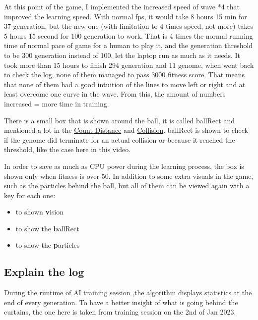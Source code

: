 At this point of the game, I implemented the increased speed of wave *4 that improved the learning speed. With normal fps, it would take 8 hours 15 min for 37 generation, but the new one (with limitation to 4 times speed, not more) takes 5 hours 15 second for 100 generation to work. That is 4 times the normal running time of normal pace of game for a human to play it, and the generation threshold to be 300 generation instead of 100, let the laptop run as much as it needs. It took more than 15 hours to finish 294 generation and 11 genome, when went back to check the log, none of them managed to pass 3000 fitness score. That means that none of them had a good intuition of the lines to move left or right and at least overcome one curve in the wave. From this, the amount of numbers increased = more time in training.

There is a small box that is shown around the ball, it is called ballRect and mentioned a lot in the \hyperref[sec:count-distance]{Count Distance} and \hyperref[sec:collision]{Collision}. ballRect is shown to check if the genome did terminate for an actual collision or because it reached the threshold, like the case here in this video.

In order to save as much as CPU power during the learning process, the box is shown only when fitness is over 50. In addition to some extra visuals in the game, such as the particles behind the ball, but all of them can be viewed again with a key for each one:
\begin{itemize}
\item {} to shown \textbf{v}ision
\item {} to show the \textbf{b}allRect
\item {} to show the \textbf{p}articles
\end{itemize}

\subsection{Explain the log}\label{sec:explain-the-log]}

During the runtime of AI training session ,the algorithm displays statistics at the end of every generation. To have a better insight of what is going behind the curtains, the one here is taken from training session on the 2nd of Jan 2023.

